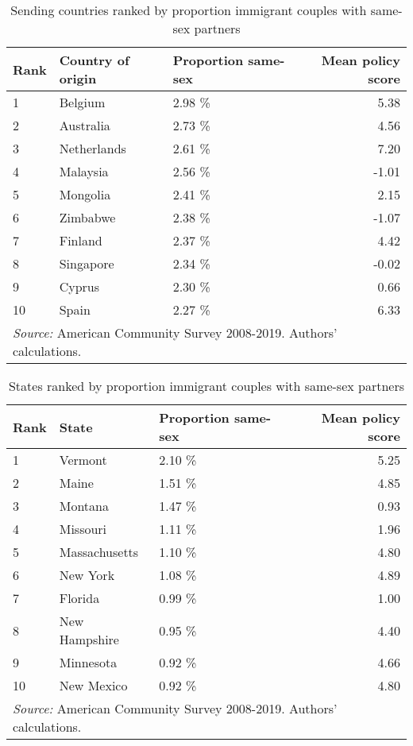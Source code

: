 \documentclass[
  11pt,
]{article}
\begin{document}
\begin{table}

\caption{\label{tab:country-tab}Sending countries ranked by proportion immigrant couples with same-sex partners}
\centering
\begin{tabular}[t]{lllr}
\toprule
Rank & Country of origin & Proportion same-sex & Mean policy score\\
\midrule
1 & Belgium & 2.98 \% & 5.38\\
2 & Australia & 2.73 \% & 4.56\\
3 & Netherlands & 2.61 \% & 7.20\\
4 & Malaysia & 2.56 \% & -1.01\\
5 & Mongolia & 2.41 \% & 2.15\\
6 & Zimbabwe & 2.38 \% & -1.07\\
7 & Finland & 2.37 \% & 4.42\\
8 & Singapore & 2.34 \% & -0.02\\
9 & Cyprus & 2.30 \% & 0.66\\
10 & Spain & 2.27 \% & 6.33\\
\bottomrule
\multicolumn{4}{l}{\rule{0pt}{1em}\textit{Source:} American Community Survey 2008-2019. Authors' calculations.}\\
\end{tabular}
\end{table}

\begin{table}

\caption{\label{tab:state-tab}States ranked by proportion immigrant couples with same-sex partners}
\centering
\begin{tabular}[t]{lllr}
\toprule
Rank & State & Proportion same-sex & Mean policy score\\
\midrule
1 & Vermont & 2.10 \% & 5.25\\
2 & Maine & 1.51 \% & 4.85\\
3 & Montana & 1.47 \% & 0.93\\
4 & Missouri & 1.11 \% & 1.96\\
5 & Massachusetts & 1.10 \% & 4.80\\
6 & New York & 1.08 \% & 4.89\\
7 & Florida & 0.99 \% & 1.00\\
8 & New Hampshire & 0.95 \% & 4.40\\
9 & Minnesota & 0.92 \% & 4.66\\
10 & New Mexico & 0.92 \% & 4.80\\
\bottomrule
\multicolumn{4}{l}{\rule{0pt}{1em}\textit{Source:} American Community Survey 2008-2019. Authors' calculations.}\\
\end{tabular}
\end{table}
\end{document}
